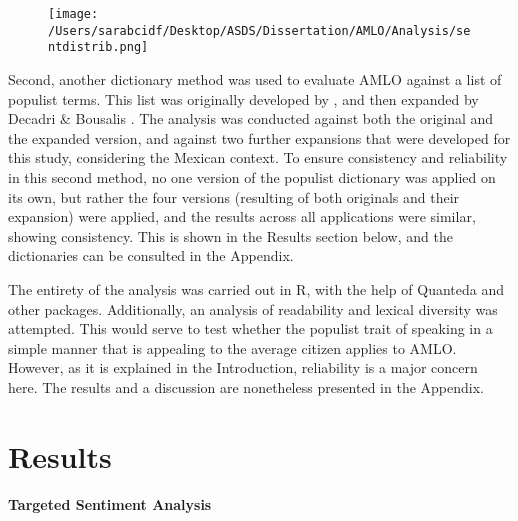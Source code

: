\documentclass[]{article}
\begin{document}
\begin{figure}[H]
	\centering
	\caption{\label{}}
	\texttt{[image: /Users/sarabcidf/Desktop/ASDS/Dissertation/AMLO/Analysis/sentdistrib.png]}
\end{figure}

Second, another dictionary method was used to evaluate AMLO against a list of populist terms. This list was originally developed by \cite{rooduijn_measuring_2011}, and then expanded by Decadri \& Bousalis \cite{decadri_populism_2020}. The analysis was conducted against both the original and the expanded version, and against two further expansions that were developed for this study, considering the Mexican context. To ensure consistency and reliability in this second method, no one version of the populist dictionary was applied on its own, but rather the four versions (resulting of both originals and their expansion) were applied, and the results across all applications were similar, showing consistency. This is shown in the Results section below, and the dictionaries can be consulted in the Appendix. 

The entirety of the analysis was carried out in R, with the help of Quanteda \cite{quanteda2018} and other packages. Additionally, an analysis of readability and lexical diversity was attempted. This would serve to test whether the populist trait of speaking in a simple manner that is appealing to the average citizen applies to AMLO. However, as it is explained in the Introduction, reliability is a major concern here. The results and a discussion are nonetheless presented in the Appendix. 

\section{Results}

\vspace{.5cm}
\noindent\textbf{Targeted Sentiment Analysis}
\vspace{.5cm}

\noindent 
\end{document}
